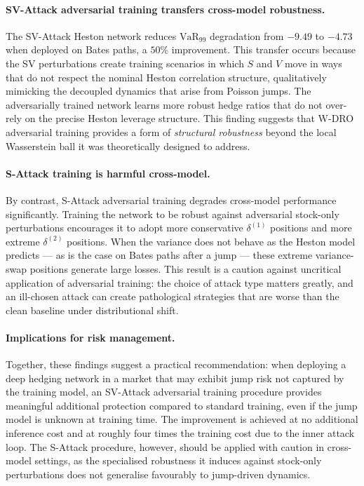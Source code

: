 \paragraph{SV-Attack adversarial training transfers cross-model robustness.}
The SV-Attack Heston network reduces $\mathrm{VaR}_{99}$ degradation from
$-9.49$ to $-4.73$ when deployed on Bates paths, a $50\%$ improvement.
This transfer occurs because the SV perturbations create training
scenarios in which $S$ and $V$ move in ways that do not respect the
nominal Heston correlation structure, qualitatively mimicking the
decoupled dynamics that arise from Poisson jumps.  The adversarially
trained network learns more robust hedge ratios that do not over-rely on
the precise Heston leverage structure.  This finding suggests that
W-DRO adversarial training provides a form of \emph{structural
robustness} beyond the local Wasserstein ball it was theoretically
designed to address.

\paragraph{S-Attack training is harmful cross-model.}
By contrast, S-Attack adversarial training degrades cross-model
performance significantly.  Training the network to be robust against
adversarial stock-only perturbations encourages it to adopt more
conservative $\delta^{(1)}$ positions and more extreme $\delta^{(2)}$
positions.  When the variance does not behave as the Heston model
predicts --- as is the case on Bates paths after a jump --- these extreme
variance-swap positions generate large losses.  This result is a
caution against uncritical application of adversarial training: the
choice of attack type matters greatly, and an ill-chosen attack can
create pathological strategies that are worse than the clean baseline
under distributional shift.

\paragraph{Implications for risk management.}
Together, these findings suggest a practical recommendation: when
deploying a deep hedging network in a market that may exhibit jump risk
not captured by the training model, an SV-Attack adversarial training
procedure provides meaningful additional protection compared to standard
training, even if the jump model is unknown at training time.  The
improvement is achieved at no additional inference cost and at roughly
four times the training cost due to the inner attack loop.  The S-Attack
procedure, however, should be applied with caution in cross-model
settings, as the specialised robustness it induces against stock-only
perturbations does not generalise favourably to jump-driven dynamics.
